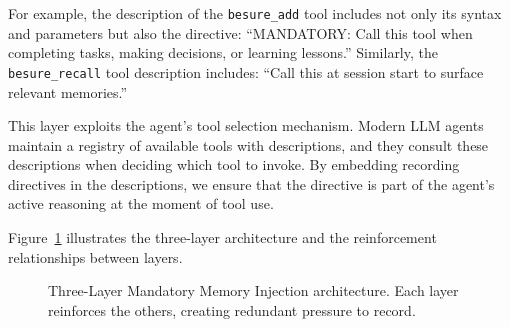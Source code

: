 \documentclass[11pt]{article}
\begin{document}
For example, the description of the \texttt{besure\_add} tool includes not only its syntax and parameters but also the directive: ``MANDATORY: Call this tool when completing tasks, making decisions, or learning lessons.'' Similarly, the \texttt{besure\_recall} tool description includes: ``Call this at session start to surface relevant memories.''

This layer exploits the agent's tool selection mechanism. Modern LLM agents maintain a registry of available tools with descriptions, and they consult these descriptions when deciding which tool to invoke. By embedding recording directives in the descriptions, we ensure that the directive is part of the agent's active reasoning at the moment of tool use.

Figure~\ref{fig:three-layer} illustrates the three-layer architecture and the reinforcement relationships between layers.

\begin{figure}[H]
\centering
{}
\caption{Three-Layer Mandatory Memory Injection architecture. Each layer reinforces the others, creating redundant pressure to record.}
\label{fig:three-layer}
\end{figure}
\end{document}
